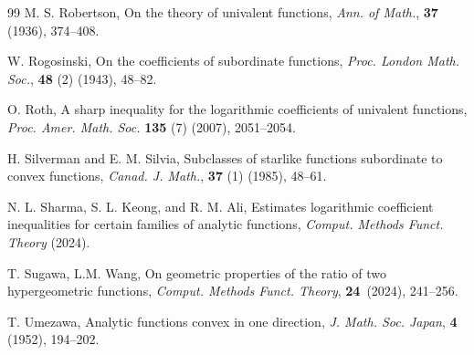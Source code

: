 \documentclass[a4paper,12pt]{amsart}
\theoremstyle{definition}
\begin{document}
\begin{thebibliography}{99}
{\sc M. S. Robertson}, On the theory of univalent functions, 
{\it Ann. of Math.}, \textbf{37} (1936), 374--408.



  {\sc W. Rogosinski}, On the coefficients of subordinate functions, {\it Proc. London Math. Soc.}, {\bf 48} (2) (1943),
 48–82.



{\sc O. Roth}, A sharp inequality for the logarithmic coefficients of univalent functions, {\it Proc. Amer. Math. Soc.} \textbf{135} (7) (2007), 2051--2054.



{\sc H. Silverman and E. M. Silvia},
Subclasses of starlike functions subordinate to convex functions,
{\it Canad. J. Math.}, \textbf{37} (1) (1985), 48--61.


{\sc N. L. Sharma, S. L. Keong, and R. M. Ali}, Estimates logarithmic coefficient inequalities for certain families of analytic functions, \textit{Comput. Methods Funct. Theory} (2024).


{\sc T. Sugawa, L.M. Wang}, On geometric properties of the ratio of two hypergeometric functions, {\it Comput. Methods Funct. Theory}, \textbf{24}~(2024), 241--256.



{\sc T. Umezawa}, 
Analytic functions convex in one direction, 
{\it J. Math. Soc. Japan}, \textbf{4} (1952), 194--202.

\end{thebibliography}
\end{document}
